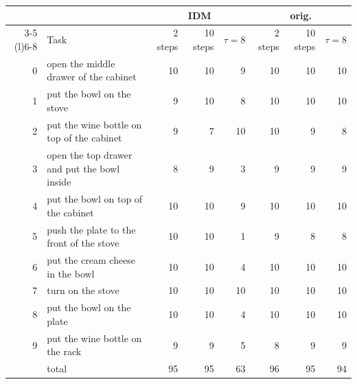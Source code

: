 \begin{tabular}{@{}rlrrrrrr@{}}
\toprule
& & \multicolumn{3}{c}{IDM} & \multicolumn{3}{c}{orig.} \\ \cmidrule(lr){3-5} \cmidrule(l){6-8}
& Task & 2 steps & 10 steps & $\tau{=}8$ & 2 steps & 10 steps & $\tau{=}8$ \\
\midrule
0 & open the middle drawer of the cabinet & 10 & 10 & 9 & 10 & 10 & 10 \\
1 & put the bowl on the stove & 9 & 10 & 8 & 10 & 10 & 10 \\
2 & put the wine bottle on top of the cabinet & 9 & 7 & 10 & 10 & 9 & 8 \\
3 & open the top drawer and put the bowl inside & 8 & 9 & 3 & 9 & 9 & 9 \\
4 & put the bowl on top of the cabinet & 10 & 10 & 9 & 10 & 10 & 10 \\
5 & push the plate to the front of the stove & 10 & 10 & 1 & 9 & 8 & 8 \\
6 & put the cream cheese in the bowl & 10 & 10 & 4 & 10 & 10 & 10 \\
7 & turn on the stove & 10 & 10 & 10 & 10 & 10 & 10 \\
8 & put the bowl on the plate & 10 & 10 & 4 & 10 & 10 & 10 \\
9 & put the wine bottle on the rack & 9 & 9 & 5 & 8 & 9 & 9 \\
\midrule
& total & 95 & 95 & 63 & 96 & 95 & 94 \\
\bottomrule
\end{tabular}
